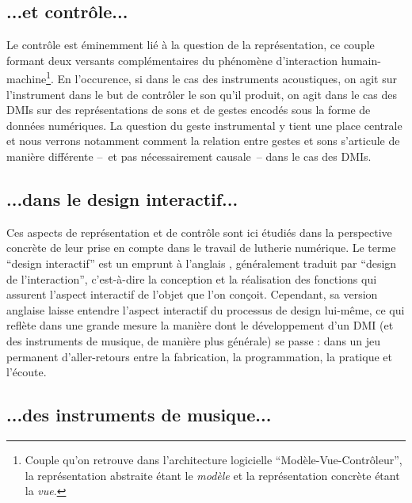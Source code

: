 \subsection*{...et contrôle...}

\noindent Le contrôle est éminemment lié à la question de la représentation, ce couple formant deux versants complémentaires du phénomène d'interaction humain-machine\footnote{Couple qu'on retrouve dans l'architecture logicielle ``Modèle-Vue-Contrôleur'', la représentation abstraite étant le \textit{modèle} et la représentation concrète étant la \textit{vue}.}. En l'occurence, si dans le cas des instruments acoustiques, on agit sur l'instrument dans le but de contrôler le son qu'il produit, on agit dans le cas des \glspl{DMI} sur des représentations de sons et de gestes encodés sous la forme de données numériques. La question du geste instrumental y tient une place centrale et nous verrons notamment comment la relation entre gestes et sons s'articule de manière différente --~et pas nécessairement causale~-- dans le cas des \glspl{DMI}.

\subsection*{...dans le design interactif...}

\noindent Ces aspects de représentation et de contrôle sont ici étudiés dans la perspective concrète de leur prise en compte dans le travail de lutherie numérique. Le terme ``design interactif'' est un emprunt à l'anglais , généralement traduit par ``design de l'interaction'', c'est-à-dire la conception et la réalisation des fonctions qui assurent l'aspect interactif de l'objet que l'on conçoit. Cependant, sa version anglaise laisse entendre l'aspect interactif du processus de design lui-même, ce qui reflète dans une grande mesure la manière dont le développement d'un \gls{DMI} (et des instruments de musique, de manière plus générale) se passe : dans un jeu permanent d'aller-retours entre la fabrication, la programmation, la pratique et l'écoute.

\subsection*{...des instruments de musique...}

